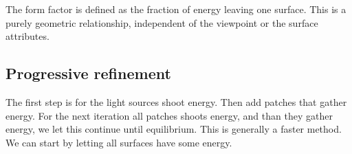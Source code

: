 The form factor is defined as the fraction of energy leaving one surface. This is a purely geometric relationship, independent of the viewpoint or the surface attributes. 

\subsection*{Progressive refinement}
The first step is for the light sources shoot energy. Then add patches that gather energy. For the next iteration all patches shoots energy, and than they gather energy, we let this continue until equilibrium. This is generally a faster method. We can start by letting all surfaces have some energy. 

















